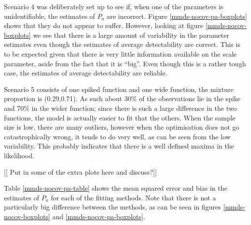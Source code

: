 Scenario 4 was deliberately set up to see if, when one of the parameters is unidentifiable, the estimates of $P_a$ are incorrect. Figure \ref{mmds-nocov-pa-boxplots} shows that they do not appear to suffer. However, looking at figure \ref{mmds-nocov-boxplots} we see that there is a large amount of variability in the parameter estimates even though the estimates of average detectability are correct. This is to be expected given that there is very little information available on the scale parameter, aside from the fact that it is ``big''. Even though this is a rather tough case, the estimates of average detectability are reliable. 

Scenario 5 consists of one spiked function and one wide function, the mixture proportion is (0.29,0.71). As such about 30\% of the observations lie in the spike and 70\% in the wider function; since there is such a large difference in the two functions, the model is actually easier to fit that the others. When the sample size is low, there are many outliers, however when the optimisation does not go catastrophically wrong, it tends to do very well, as can be seen from the low variability. This probably indicates that there is a well defined maxima in the likelihood.

[[ Put in some of the extra plots here and discuss?]]


Table \ref{mmds-nocov-pa-table} shows the mean squared error and bias in the estimates of $P_a$ for each of the fitting methods. Note that there is not a particularly big difference between the methods, as can be seen in figures \ref{mmds-nocov-boxplots} and \ref{mmds-nocov-pa-boxplots}.

